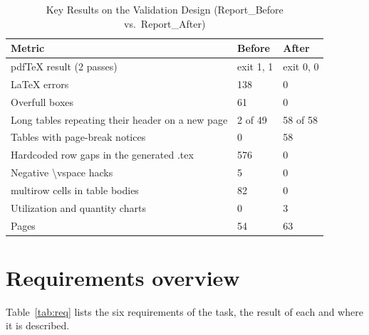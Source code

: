 \documentclass[11pt,a4paper]{article}
\newcommand{\thead}{\rowcolor{headbg}}
\newcommand{\hd}[1]{\sffamily\bfseries\color{ink}#1}
\newcommand{\breakus}{\textunderscore\allowbreak}
\newcommand{\code}[1]{{\ttfamily\let\_\breakus #1}}
\newcommand{\bs}{\textbackslash}
\begin{document}
\newpage
{\sffamily\small\setcounter{tocdepth}{1}\tableofcontents}

\vspace{10pt}
\begin{table}[H]
\caption{Key Results on the Validation Design (Report\_Before vs.\ Report\_After)}\label{tab:key}
\small
\begin{tabularx}{\linewidth}{@{}Y C{2.7cm} C{2.7cm}@{}}
\toprule
\thead \hd{Metric} & \hd{Before} & \hd{After} \\
\midrule
pdfTeX result (2 passes)                       & exit 1, 1        & exit 0, 0 \\
LaTeX errors                                    & \textcolor{fail}{138} & 0 \\
Overfull boxes                                  & \textcolor{fail}{61}  & 0 \\
Long tables repeating their header on a new page& 2 of 49          & 58 of 58 \\
Tables with page-break notices                  & 0                & 58 \\
Hardcoded row gaps in the generated \code{.tex} & 576              & 0 \\
Negative \code{\bs vspace} hacks                & 5                & 0 \\
\code{multirow} cells in table bodies           & 82               & 0 \\
Utilization and quantity charts                 & 0                & 3 \\
Pages                                           & 54               & 63 \\
\bottomrule
\end{tabularx}
\end{table}

\section{Requirements overview}

Table~\ref{tab:req} lists the six requirements of the task, the result of each and where it is described.
\end{document}
